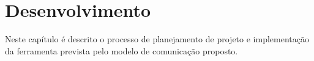 \chapter{Desenvolvimento}

Neste capítulo é descrito o processo de planejamento de projeto e implementação da ferramenta prevista pelo modelo de comunicação proposto.



